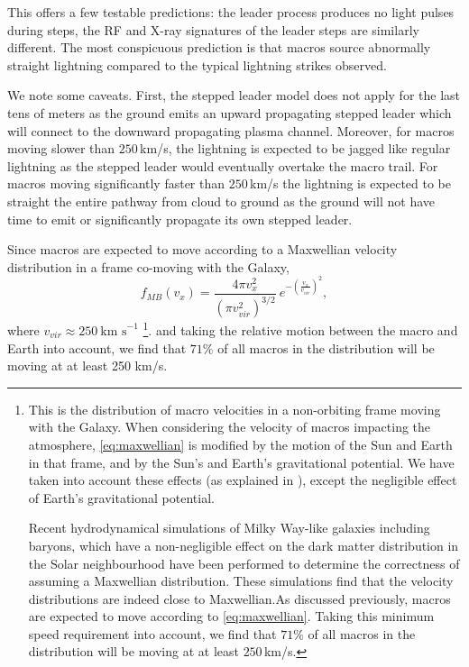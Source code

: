 \documentclass[%
reprint,
 amsmath,amssymb,
 aps,
 prd,
]{revtex4-2}
\begin{document}
        This offers a few testable predictions: the leader process produces no light pulses during steps, the RF and X-ray signatures of the leader steps are similarly different. The most conspicuous prediction is that {macros source abnormally straight lightning} compared to the typical lightning strikes observed.

        We note some caveats. First, the stepped leader model does not apply for the last tens of meters as the ground emits an upward propagating stepped leader which will connect to the downward propagating plasma channel. Moreover, for macros moving slower than $250\,$km/s, the lightning is expected to be jagged like regular lightning as the stepped leader would eventually overtake the macro trail. For macros moving significantly faster than $250\,$km/s the lightning is expected to be straight the entire pathway from cloud to ground as the ground will not have time to emit or significantly propagate its own stepped leader. 

        Since macros are expected to move according to a Maxwellian velocity distribution in a frame co-moving with the Galaxy,
        \begin{equation}\label{eq:maxwellian}
        	f_{MB}(v_x) = 
        		\frac{4\pi v_x^2}
        		{\left({\pi v_{vir}^2}\right)^{3/2}}~
        		e^{-\left(\frac{v_x}{v_{vir}}\right)^2}, 
        \end{equation}
        where $v_{vir} \approx 250~ \text{km s}^{-1}$ \footnote{
        	This is the distribution of macro velocities in a non-orbiting frame moving with the Galaxy. When considering the velocity of macros impacting the atmosphere, \eqref{eq:maxwellian} is modified by the motion of the Sun and Earth in that frame, and by the Sun's and Earth's gravitational potential. We have taken into account these effects (as explained  in \cite{Freese2013}), except the negligible effect of Earth's gravitational potential.

        	Recent hydrodynamical simulations of Milky Way-like galaxies including baryons, which have a non-negligible effect on the dark matter distribution in the Solar neighbourhood \cite{Tanabashi2018} have been performed to determine the correctness of assuming a Maxwellian distribution. These simulations find that the velocity distributions are indeed close to Maxwellian.As discussed previously, macros are expected to move according to \eqref{eq:maxwellian}. Taking this minimum speed requirement into account, we find that $71\%$ of all macros in the distribution will be moving at at least $250\,$km/s. 
    	}.
        and taking the relative motion between the macro and Earth into account, we find that $71\%$ of all macros in the distribution will be moving at at least 250 km/s.
\end{document}
